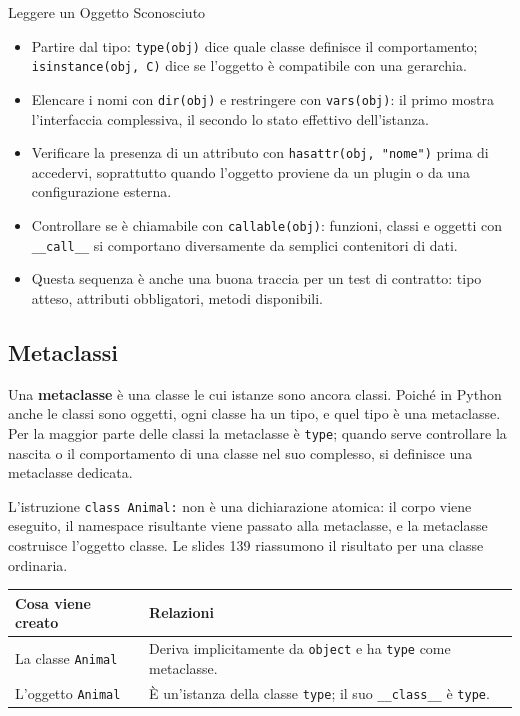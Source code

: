 \documentclass[12pt]{extarticle}
\begin{document}
\begin{cbox}{Leggere un Oggetto Sconosciuto}
\begin{itemize}
    \item Partire dal tipo: \texttt{type(obj)} dice quale classe definisce il comportamento; \texttt{isinstance(obj, C)} dice se l'oggetto è compatibile con una gerarchia.
    \item Elencare i nomi con \texttt{dir(obj)} e restringere con \texttt{vars(obj)}: il primo mostra l'interfaccia complessiva, il secondo lo stato effettivo dell'istanza.
    \item Verificare la presenza di un attributo con \texttt{hasattr(obj, "nome")} prima di accedervi, soprattutto quando l'oggetto proviene da un plugin o da una configurazione esterna.
    \item Controllare se è chiamabile con \texttt{callable(obj)}: funzioni, classi e oggetti con \texttt{\_\_call\_\_} si comportano diversamente da semplici contenitori di dati.
    \item Questa sequenza è anche una buona traccia per un test di contratto: tipo atteso, attributi obbligatori, metodi disponibili.
\end{itemize}
\end{cbox}

\subsection{Metaclassi}

\noindent Una \textbf{metaclasse} è una classe le cui istanze sono ancora classi. Poiché in Python anche le classi sono oggetti, ogni classe ha un tipo, e quel tipo è una metaclasse. Per la maggior parte delle classi la metaclasse è \texttt{type}; quando serve controllare la nascita o il comportamento di una classe nel suo complesso, si definisce una metaclasse dedicata.

\noindent L'istruzione \texttt{class Animal:} non è una dichiarazione atomica: il corpo viene eseguito, il namespace risultante viene passato alla metaclasse, e la metaclasse costruisce l'oggetto classe. Le slides 139 riassumono il risultato per una classe ordinaria.

\begin{center}
\small
\begin{tabular}{p{5.0cm}p{9.4cm}}
    \toprule
    \textbf{Cosa viene creato} & \textbf{Relazioni} \\
    \midrule
    La classe \texttt{Animal} & Deriva implicitamente da \texttt{object} e ha \texttt{type} come metaclasse. \\
    \addlinespace
    L'oggetto \texttt{Animal} & È un'istanza della classe \texttt{type}; il suo \texttt{\_\_class\_\_} è \texttt{type}. \\
    \bottomrule
\end{tabular}
\end{center}
\end{document}
